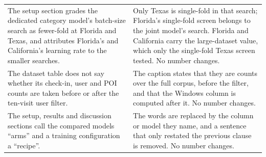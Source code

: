 \begin{table}[htb]
\begin{tabular}{@{}p{}p{}@{}}
The setup section grades the dedicated category model's
batch-size search as fewer-fold at Florida and Texas, and
attributes Florida's and California's learning rate to the
smaller searches. &
Only Texas is single-fold in that search; Florida's single-fold
screen belongs to the joint model's search. Florida and
California carry the large-dataset value, which only the
single-fold Texas screen tested. No number changes. \\
\addlinespace
The dataset table does not say whether its check-in, user and
POI counts are taken before or after the ten-visit user
filter. &
The caption states that they are counts over the full corpus,
before the filter, and that the Windows column is computed
after it. No number changes. \\
\addlinespace
The setup, results and discussion sections call the compared
models ``arms'' and a training configuration a ``recipe''. &
The words are replaced by the column or model they name, and a
sentence that only restated the previous clause is removed. No
number changes. \\
\bottomrule
\end{tabular}
\end{table}
